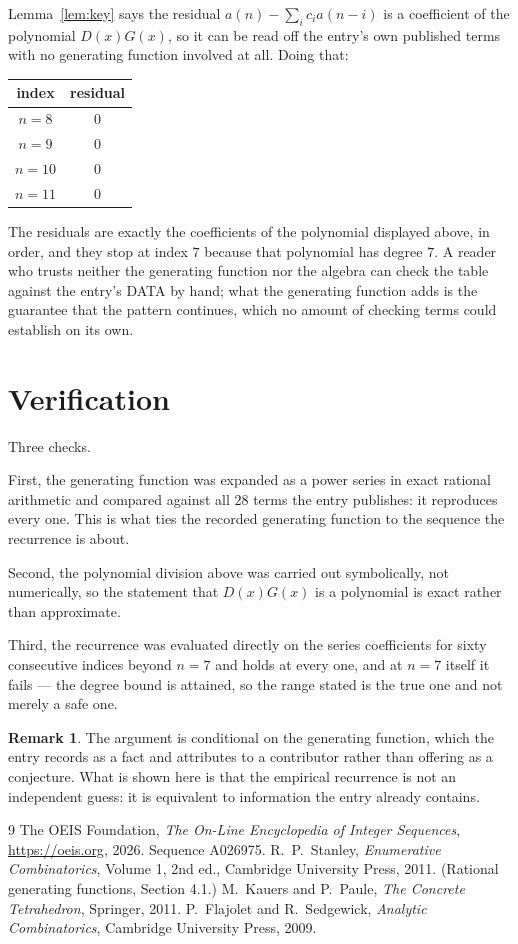 \documentclass[11pt,a4paper]{article}
\theoremstyle{plain}
\theoremstyle{definition}
\newtheorem{remark}[theorem]{Remark}
\begin{document}
Lemma~\ref{lem:key} says the residual $a(n)-\sum_ic_ia(n-i)$ is a coefficient of the
polynomial $D(x)G(x)$, so it can be read off the entry's own published terms with no
generating function involved at all. Doing that:
\begin{center}
\begin{tabular}{cc}
index & residual \\ \hline
$n=8$ & $0$ \\
$n=9$ & $0$ \\
$n=10$ & $0$ \\
$n=11$ & $0$
\end{tabular}
\end{center}
The residuals are exactly the coefficients of the polynomial displayed above, in order, and
they stop at index $7$ because that polynomial has degree $7$. A reader who trusts
neither the generating function nor the algebra can check the table against the entry's DATA
by hand; what the generating function adds is the guarantee that the pattern continues, which
no amount of checking terms could establish on its own.

\section{Verification}

Three checks.

First, the generating function was expanded as a power series in exact rational arithmetic and
compared against all $28$ terms the entry publishes: it reproduces every one. This is
what ties the recorded generating function to the sequence the recurrence is about.

Second, the polynomial division above was carried out symbolically, not numerically, so the
statement that $D(x)G(x)$ is a polynomial is exact rather than approximate.

Third, the recurrence was evaluated directly on the series coefficients for sixty consecutive
indices beyond $n=7$ and holds at every one, and at $n=7$ itself it fails --- the
degree bound is attained, so the range stated is the true one and not merely a safe one.

\begin{remark}
The argument is conditional on the generating function, which the entry records as a fact and
attributes to a contributor rather than offering as a conjecture. What is shown here is that
the empirical recurrence is not an independent guess: it is equivalent to information the
entry already contains.
\end{remark}

\begin{thebibliography}{9}
 The OEIS Foundation, \emph{The On-Line Encyclopedia of Integer
Sequences}, \url{https://oeis.org}, 2026. Sequence A026975.
 R.~P.~Stanley, \emph{Enumerative Combinatorics}, Volume 1, 2nd ed.,
Cambridge University Press, 2011. (Rational generating functions, Section 4.1.)
 M.~Kauers and P.~Paule, \emph{The Concrete Tetrahedron}, Springer, 2011.
 P.~Flajolet and R.~Sedgewick, \emph{Analytic Combinatorics}, Cambridge
University Press, 2009.
\end{thebibliography}
\end{document}
